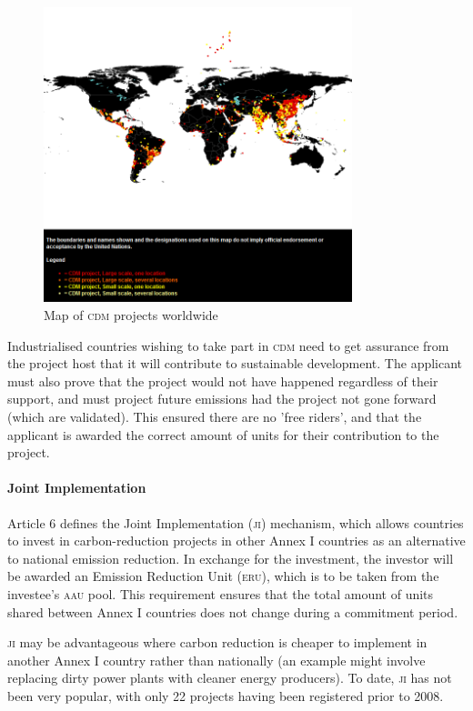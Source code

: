 \begin{figure}[h!]
	\centering
	\includegraphics[width=0.8\textwidth]{img/CDM_Map.png}
	\caption{Map of \textsc{cdm} projects worldwide~\cite{UNFCCC-CDM-map}}
	\label{fig:cdm_map}
\end{figure}

Industrialised countries wishing to take part in \textsc{cdm} need to get assurance from the project host that it will contribute to sustainable development. The applicant must also prove that the project would not have happened regardless of their support, and must project future emissions had the project not gone forward (which are validated). This ensured there are no 'free riders', and that the applicant is awarded the correct amount of units for their contribution to the project.

\paragraph{Joint Implementation}

Article 6 defines the Joint Implementation (\textsc{ji}) mechanism, which allows countries to invest in carbon-reduction projects in other Annex I countries as an alternative to national emission reduction. In exchange for the investment, the investor will be awarded an Emission Reduction Unit (\textsc{eru}), which is to be taken from the investee's \textsc{aau} pool. This requirement ensures that the total amount of units shared between Annex I countries does not change during a commitment period.

\textsc{ji} may be advantageous where carbon reduction is cheaper to implement in another Annex I country rather than nationally (an example might involve replacing dirty power plants with cleaner energy producers). To date, \textsc{ji} has not been very popular, with only 22 projects having been registered prior to 2008.

